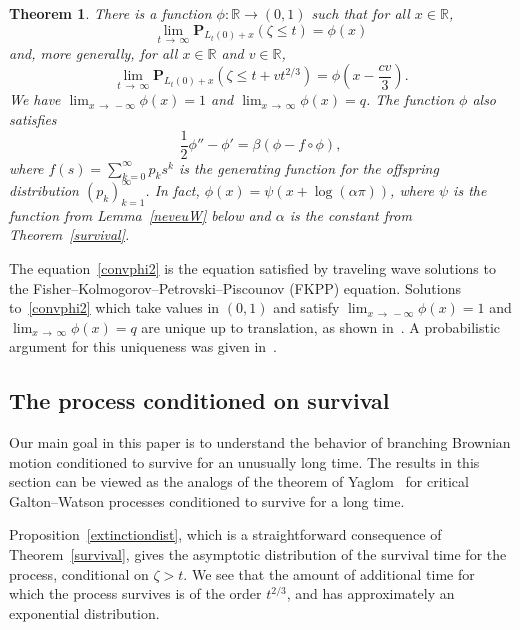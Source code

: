 \documentclass[10pt]{amsart}
\newtheorem{theo}{Theorem}[section]
\theoremstyle{definition}\newtheorem{defi}[theo]{Definition}\newtheorem{rema}[theo]{Remark}\newtheorem{exam}[theo]{Example}\newtheorem{exem}[theo]{Example}\newtheorem{nota}[theo]{Notation}
\renewcommand*\P{\mathbf{P}}
\newcommand*\R{\mathbb{R}}
\newcommand{\1} {\mathds{1}}
\begin{document}
\begin{theo}\label{survivex}
There is a function $\phi: \R \rightarrow (0,1)$ such that for all $x \in \R$,
\begin{equation}\label{convphi}
\lim_{t\,\rightarrow\,\infty} \P_{L_t(0) + x}(\zeta \leq t) = \phi(x)
\end{equation}
and, more generally, for all $x \in \R$ and $v \in \R$,
\begin{equation}\label{convphi2}
\lim_{t\,\rightarrow\,\infty} \P_{L_t(0)+x}\left(\zeta \leq t + vt^{2/3}\right) = \phi\left(x - \frac{cv}{3}\right).
\end{equation}
We have $\lim_{x\,\rightarrow\,-\infty} \phi(x) = 1$ and $\lim_{x\,\rightarrow\,\infty} \phi(x) = q$. The function $\phi$ also satisfies
\begin{equation}\label{FKPPwave}
\frac{1}{2} \phi'' - \phi' = \beta\left(\phi - f \circ \phi\right),
\end{equation}
where $f(s) = \sum_{k=0}^{\infty} p_k s^k$ is the generating function for the offspring distribution $(p_k)_{k=1}^{\infty}$. In fact, $\phi(x) = \psi(x+\log(\alpha\pi))$, where $\psi$ is the function from Lemma~\ref{neveuW} below and $\alpha$ is the constant from Theorem~\ref{survival}.
\end{theo}


The equation~\eqref{convphi2} is the equation satisfied by traveling wave solutions to the Fi\-sher--Kolmogorov--Petrovski--Piscounov (FKPP) equation. Solutions to~\eqref{convphi2} which take values in $(0,1)$ and satisfy $\lim_{x\,\rightarrow\,-\infty} \phi(x) = 1$ and $\lim_{x\,\rightarrow\,\infty} \phi(x) = q$ are unique up to translation, as shown in~\cite{kpp}. A probabilistic argument for this uniqueness was given in~\cite{kyp04}.


\subsection{The process conditioned on survival}
Our main goal in this paper is to understand the behavior of branching Brownian motion conditioned to survive for an unusually long time. The results in this section can be viewed as the analogs of the theorem of Yaglom~\cite{yaglom} for critical Galton--Watson processes conditioned to survive for a long time.

Proposition~\ref{extinctiondist}, which is a straightforward consequence of Theorem~\ref{survival}, gives the asymptotic distribution of the survival time for the process, conditional on $\zeta > t$. We see that the amount of additional time for which the process survives is of the order $t^{2/3}$, and has approximately an exponential distribution.
\end{document}
